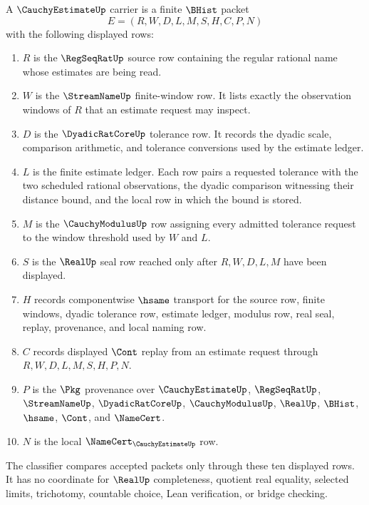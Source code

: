 \begin{definition}\label{def:cauchy-estimate-carrier}
A $\CauchyEstimateUp$ carrier is a finite $\BHist$ packet
$$
E=(R,W,D,L,M,S,H,C,P,N)
$$
with the following displayed rows:
\begin{enumerate}
\item $R$ is the $\RegSeqRatUp$ source row containing the regular rational name whose estimates are being read.
\item $W$ is the $\StreamNameUp$ finite-window row. It lists exactly the observation windows of $R$ that an estimate request may inspect.
\item $D$ is the $\DyadicRatCoreUp$ tolerance row. It records the dyadic scale, comparison arithmetic, and tolerance conversions used by the estimate ledger.
\item $L$ is the finite estimate ledger. Each row pairs a requested tolerance with the two scheduled rational observations, the dyadic comparison witnessing their distance bound, and the local row in which the bound is stored.
\item $M$ is the $\CauchyModulusUp$ row assigning every admitted tolerance request to the window threshold used by $W$ and $L$.
\item $S$ is the $\RealUp$ seal row reached only after $R,W,D,L,M$ have been displayed.
\item $H$ records componentwise $\hsame$ transport for the source row, finite windows, dyadic tolerance row, estimate ledger, modulus row, real seal, replay, provenance, and local naming row.
\item $C$ records displayed $\Cont$ replay from an estimate request through $R,W,D,L,M,S,H,P,N$.
\item $P$ is the $\Pkg$ provenance over $\CauchyEstimateUp$, $\RegSeqRatUp$, $\StreamNameUp$, $\DyadicRatCoreUp$, $\CauchyModulusUp$, $\RealUp$, $\BHist$, $\hsame$, $\Cont$, and $\NameCert$.
\item $N$ is the local $\NameCert_{\CauchyEstimateUp}$ row.
\end{enumerate}
The classifier compares accepted packets only through these ten displayed rows. It has no coordinate for $\RealUp$ completeness, quotient real equality, selected limits, trichotomy, countable choice, Lean verification, or bridge checking.
\end{definition}

